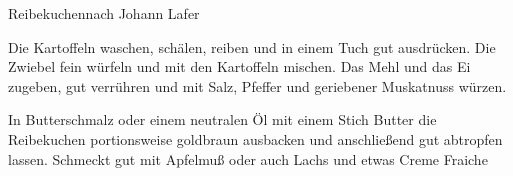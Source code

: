\begin{recipe}{Reibekuchen}{nach Johann Lafer}
  \inglist

  \steps
  Die Kartoffeln waschen, schälen, reiben und in einem Tuch gut ausdrücken. Die Zwiebel
  fein würfeln und mit den Kartoffeln mischen. Das Mehl und das Ei zugeben, gut
  verrühren und mit Salz, Pfeffer und geriebener Muskatnuss würzen.

  In Butterschmalz oder einem neutralen Öl mit einem Stich Butter die Reibekuchen
  portionsweise goldbraun ausbacken und anschließend gut abtropfen lassen. Schmeckt gut
  mit Apfelmuß oder auch Lachs und etwas Creme Fraiche
\end{recipe}

